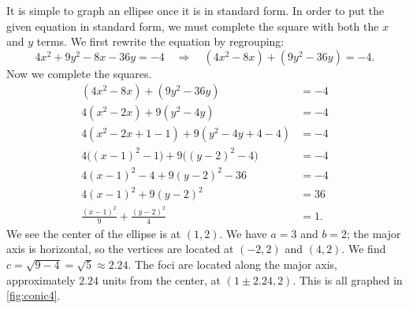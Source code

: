 {It is simple to graph an ellipse once it is in standard form. In order to put the given equation in standard form, we must complete the square with both the $x$ and $y$ terms. We first rewrite the equation by regrouping:
\[4x^2+9y^2-8x-36y=-4 \quad \Rightarrow \quad (4x^2-8x) + (9y^2-36y) = -4.\]
Now we complete the squares.
\begin{align*}
	(4x^2-8x) + (9y^2-36y) &= -4\\
	4(x^2-2x) + 9(y^2-4y) &= -4 \\
	4(x^2-2x +1 - 1) + 9(y^2-4y+4-4) &= - 4\\
	4\big((x-1)^2-1\big) + 9\big((y-2)^2-4\big) &= -4\\
	4(x-1)^2 -4 + 9(y-2)^2-36 &= -4 \\
	4(x-1)^2 + 9(y-2)^2 &= 36 \\
	\frac{(x-1)^2}{9} + \frac{(y-2)^2}{4} &= 1.
\end{align*}
%
%
%
We see the center of the ellipse is at $(1,2)$. We have $a=3$ and $b=2$; the major axis is horizontal, so the vertices are located at $(-2,2)$ and $(4,2)$. We find $c=\sqrt{9-4} = \sqrt{5}\approx 2.24.$ The foci are located along the major axis, approximately $2.24$ units from the center, at $(1\pm 2.24,2)$. This is all graphed in \autoref{fig:conic4}.}

